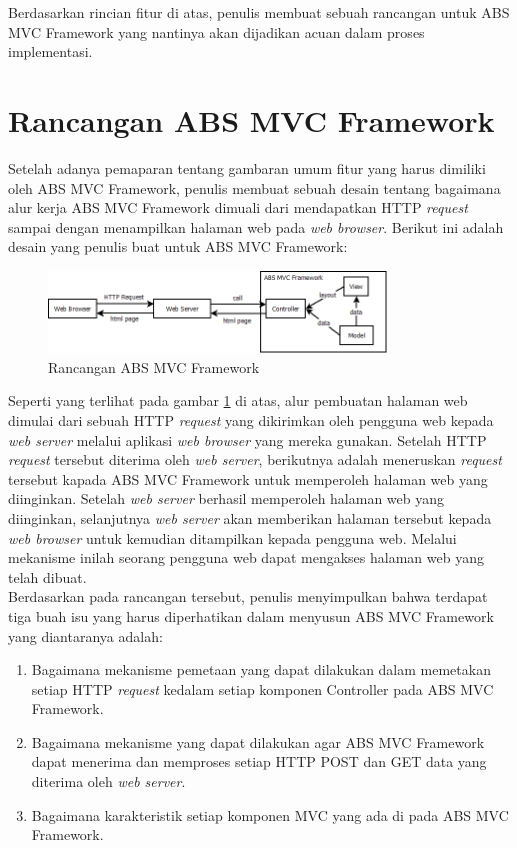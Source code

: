 Berdasarkan rincian fitur di atas, penulis membuat sebuah rancangan untuk ABS MVC Framework yang nantinya akan dijadikan acuan dalam proses implementasi.

\section{Rancangan ABS MVC Framework}

Setelah adanya pemaparan tentang gambaran umum fitur yang harus dimiliki oleh ABS MVC Framework, penulis membuat sebuah desain tentang bagaimana alur kerja ABS MVC Framework dimuali dari mendapatkan HTTP \textit{request} sampai dengan menampilkan halaman web pada \textit{web browser}. Berikut ini adalah desain yang penulis buat untuk ABS MVC Framework:

\begin{figure}
    \centering
    \includegraphics[width=0.8\textwidth]{img/abs-mvc.png}
    \caption{Rancangan ABS MVC Framework}
    \label{fig:mvcFrameworkDesign}
\end{figure}

Seperti yang terlihat pada gambar \ref{fig:mvcFrameworkDesign} di atas, alur pembuatan halaman web dimulai dari sebuah HTTP \textit{request} yang dikirimkan oleh pengguna web kepada \textit{web server} melalui aplikasi \textit{web browser} yang mereka gunakan. Setelah HTTP \textit{request} tersebut diterima oleh \textit{web server}, berikutnya adalah meneruskan \textit{request} tersebut kapada ABS MVC Framework untuk memperoleh halaman web yang diinginkan. Setelah \textit{web server} berhasil memperoleh halaman web yang diinginkan, selanjutnya \textit{web server} akan memberikan halaman tersebut kepada \textit{web browser} untuk kemudian ditampilkan kepada pengguna web. Melalui mekanisme inilah seorang pengguna web dapat mengakses halaman web yang telah dibuat.\\

Berdasarkan pada rancangan tersebut, penulis menyimpulkan bahwa terdapat tiga buah isu yang harus diperhatikan dalam menyusun ABS MVC Framework yang diantaranya adalah:

\begin{enumerate}
    \item Bagaimana mekanisme pemetaan yang dapat dilakukan dalam memetakan setiap HTTP \textit{request} kedalam setiap komponen Controller pada ABS MVC Framework.
    \item Bagaimana mekanisme yang dapat dilakukan agar ABS MVC Framework dapat menerima dan memproses setiap HTTP POST dan GET data yang diterima oleh \textit{web server}.
    \item Bagaimana karakteristik setiap komponen MVC yang ada di pada ABS MVC Framework.
\end{enumerate}
